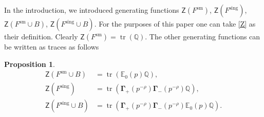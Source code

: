 \documentclass{amsart}
\newtheorem{proposition}[theorem]{Proposition}
\theoremstyle{definition}
\newcommand{\QQ} {\mathbb{Q}}		%
\newcommand{\bfGamma} {\mathbf{\Gamma}}
\newcommand{\sm}{\mathrm{sm}}
\newcommand{\sing}{\mathrm{sing}}
\newcommand{\EE}{\mathbb{E}}
\newcommand{\sfZ} {\mathsf{Z}}
\newcommand{\tr}{\operatorname{tr}}
\begin{document}
In the introduction, we introduced generating functions $\sfZ(F^{\sm})$, $\sfZ(F^{\sing})$, $\sfZ(F^{\sm}\cup B)$, $\sfZ(F^{\sing}\cup B)$. For the purposes of this paper one can take \eqref{Z} as their definition. Clearly $\sfZ(F^{\sm}) = \tr(\QQ)$. The other generating functions can be written as traces as follows
\begin{proposition} \label{Z=tr}
\begin{align} 
\sfZ(F^{\sm} \cup B) &= \tr(\EE_0(p) \QQ), \label{ZsmB} \\
\sfZ(F^{\sing}) &= \tr(\bfGamma_+(p^{-\rho}) \bfGamma_-(p^{-\rho}) \QQ), \label{Zsing} \\
\sfZ(F^{\sing} \cup B) &= \tr(\bfGamma_+(p^{-\rho}) \bfGamma_-(p^{-\rho}) \EE_0(p) \QQ) \label{ZsingB}. 
\end{align}
\end{proposition}
\end{document}
